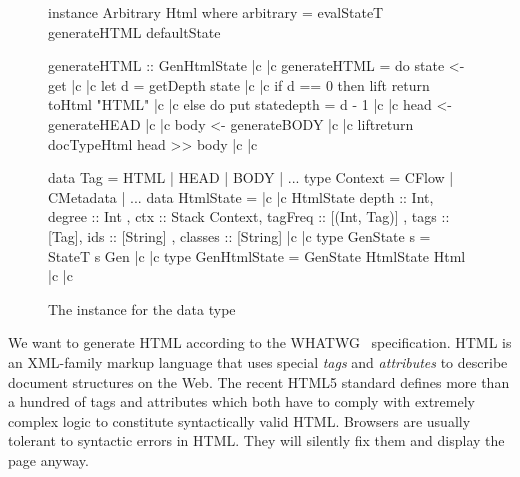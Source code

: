 \begin{figure}[!t]
  \centering
  \begin{haskell}
instance Arbitrary Html where
  arbitrary = evalStateT generateHTML defaultState

generateHTML :: GenHtmlState |c \label{ref.generateHTML.begin} |c
generateHTML = do
  state <- get |c \label{ref.generateHTML.getState} |c
  let d = getDepth state |c \label{ref.generateHTML.getDepth} |c
  if d == 0
  then lift \dollar return \dollar toHtml "HTML" |c \label{ref.generateHTML.returnString} |c
  else do put state{depth = d - 1} |c \label{ref.generateHTML.updateState} |c
           head <- generateHEAD |c \label{ref.generateHTML.newHead} |c
           body <- generateBODY |c \label{ref.generateHTML.newBody} |c
           lift\dollar return \dollar docTypeHtml \dollar head >> body |c \label{ref.generateHTML.end} |c

data Tag = HTML | HEAD | BODY | ...
type Context = CFlow | CMetadata | ...
data HtmlState = |c \label{ref.HtmlState.begin} |c
  HtmlState { depth    :: Int,           degree  :: Int
             , ctx     :: Stack Context, tagFreq :: [(Int, Tag)]
             , tags    :: [Tag],         ids     :: [String]
             , classes :: [String] } |c \label{ref.HtmlState.end} |c
type GenState s = StateT s Gen |c \label{ref.GenState} |c
type GenHtmlState = GenState HtmlState Html |c \label{ref.GenHtmlState} |c
  \end{haskell}
  \caption{The  instance for the  data type}
  \label{fig.html.arb.def}
\end{figure}

We want to generate HTML according to the WHATWG~\cite{htmlspec} specification. HTML is an XML-family markup language that uses special \emph{tags} and \emph{attributes} to describe document structures on the Web. The recent HTML5 standard defines more than a hundred of tags and attributes which both have to comply with extremely complex logic to constitute  syntactically valid HTML. Browsers are usually tolerant to syntactic errors in HTML. They will silently fix them and display the page anyway.

